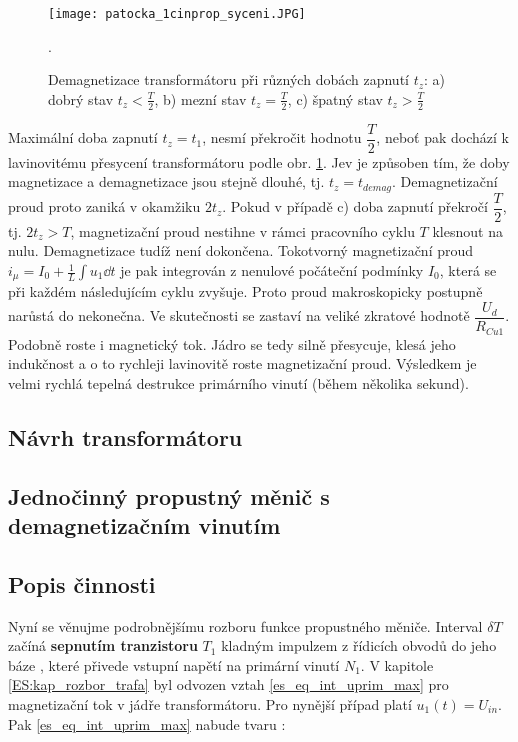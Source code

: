     \begin{figure}[ht!]
      \centering
      \texttt{[image: patocka\_1cinprop\_syceni.JPG]}
      \caption{Demagnetizace transformátoru při různých dobách zapnutí \(t_z\): a) dobrý stav 
               \(t_z < \frac{T}{2}\), b) mezní stav \(t_z = \frac{T}{2}\), c) špatný stav \(t_z > 
               \frac{T}{2}\)}.
      \label{enz:fig_fey_1cinprop_syc}
    \end{figure}
    Maximální doba zapnutí \(t_z=t_1\), nesmí překročit hodnotu \(\dfrac{T}{2}\), neboť pak 
    dochází k lavinovitému přesycení transformátoru podle obr. \ref{enz:fig_fey_1cinprop_syc}.  
    Jev je způsoben tím, že doby magnetizace a demagnetizace jsou stejně dlouhé, tj. 
    \(t_z=t_{demag}\). Demagnetizační proud proto zaniká v okamžiku \(2t_z\). Pokud v případě c) 
    doba zapnutí překročí \(\dfrac{T}{2}\), tj. \(2t_z > T\), magnetizační proud nestihne v rámci 
    pracovního cyklu \(T\) klesnout na nulu. Demagnetizace tudíž není dokončena. Tokotvorný 
    magnetizační proud \(i_\mu=I_0 + \frac{1}{L}\int{u_1\dd{t}}\) je pak integrován z nenulové 
    počáteční podmínky \(I_0\), která se při každém následujícím cyklu zvyšuje. Proto  proud 
    makroskopicky postupně narůstá do nekonečna. Ve skutečnosti se zastaví na veliké zkratové 
    hodnotě \(\dfrac{U_d}{R_{Cu1}}\). Podobně roste i magnetický tok. Jádro se tedy silně 
    přesycuje, klesá jeho indukčnost a o to rychleji lavinovitě roste magnetizační proud. 
    Výsledkem je velmi rychlá tepelná destrukce primárního vinutí (během několika sekund).      

  \subsection{Návrh transformátoru}
    
  \subsection{Jednočinný propustný měnič s demagnetizačním vinutím}
    
    
  \subsection{Popis činnosti}\label{ENZ:kap_forward_converter_describe}
    Nyní se věnujme podrobnějšímu rozboru funkce propustného měniče. Interval $\delta T$ začíná
    \textbf{sepnutím tranzistoru} $T_1$ kladným impulzem z řídicích obvodů do jeho báze     
    \cite[s.~131]{Hammembauer}, které přivede vstupní napětí na primární vinutí $N_1$. V kapitole
    \ref{ES:kap_rozbor_trafa} byl odvozen vztah \ref{es_eq_int_uprim_max} pro magnetizační tok v 
    jádře transformátoru. Pro nynější případ platí $u_1(t) = U_{in}$. Pak 
    \ref{es_eq_int_uprim_max} nabude tvaru 
    \cite[s.~104]{Patocka}:
    
